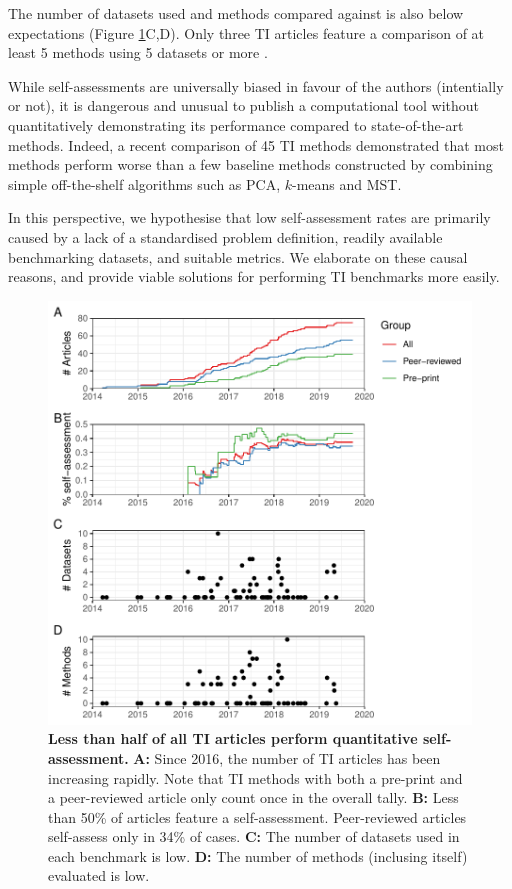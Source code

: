The number of datasets used and methods compared against is also below expectations (Figure \ref{fig:benchmarks_over_time}C,D). Only three TI articles feature a comparison of at least 5 methods using 5 datasets or more \cite{sharma_forksfindingorderings_2017,guo_hoplandsinglecellpseudotime_2017,parra_reconstructingcomplexlineage_2018}.

While self-assessments are universally biased in favour of the authors\cite{norel_selfassessmenttrapcan_2011} (intentially or not), it is dangerous and unusual to publish a computational tool without quantitatively demonstrating its performance compared to state-of-the-art methods. Indeed, a recent comparison of 45 TI methods demonstrated that most methods perform worse than a few baseline methods constructed by combining simple off-the-shelf algorithms such as PCA, $k$-means and MST\cite{saelens_comparisonsinglecelltrajectory_2019}.

In this perspective, we hypothesise that low self-assessment rates are primarily caused by a lack of a standardised problem definition, readily available benchmarking datasets, and suitable metrics. 
We elaborate on these causal reasons, and provide viable solutions for performing TI benchmarks more easily.

\begin{figure}[htb!]
	\centering
	\includegraphics[width=.75\linewidth]{fig/self_assessment.pdf} 
	\caption{
		\textbf{Less than half of all TI articles perform quantitative self-assessment.} 
		\textbf{A:} Since 2016, the number of TI articles has been increasing rapidly. Note that TI methods with both a pre-print and a peer-reviewed article only count once in the overall tally.
		\textbf{B:} Less than 50\% of articles feature a self-assessment. Peer-reviewed articles self-assess only in 34\% of cases.
		\textbf{C:} The number of datasets used in each benchmark is low.
		\textbf{D:} The number of methods (inclusing itself) evaluated is low.
	}
	\label{fig:benchmarks_over_time}
\end{figure}

